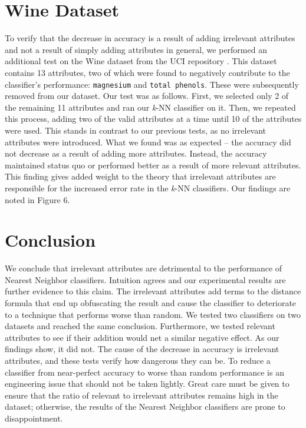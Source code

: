 \documentclass{article}
\begin{document}
\section{Wine Dataset}

To verify that the decrease in accuracy is a result of adding irrelevant attributes and not a result of simply adding attributes in general, we performed an additional test on the Wine dataset from the UCI repository \cite{wine}. This dataset contains 13 attributes, two of which were found to negatively contribute to
the classifier's performance: \texttt{magnesium} and \texttt{total phenols}. These were subsequently removed from our dataset. Our test was as follows. First, we selected only 2 of the remaining 11 attributes and ran our \textit{k}-NN classifier on it. Then, we repeated this process, adding two of the valid attributes at a time until 10 of the attributes were used. This stands in contrast to our previous tests, as no irrelevant attributes were introduced. What we found was as expected -- the accuracy did not decrease as a result of adding more attributes. Instead, the accuracy maintained status quo or performed better as a result of more relevant attributes. This finding gives added weight to the theory that irrelevant attributes are responsible for the increased error rate in the \textit{k}-NN classifiers. Our findings are noted in Figure 6. 

\section{Conclusion}

We conclude that irrelevant attributes are detrimental to the performance of Nearest Neighbor classifiers. Intuition agrees and our experimental results are further evidence to this claim. The irrelevant attributes add terms to the distance formula that end up obfuscating the result and cause the classifier to deteriorate to a technique that performs worse than random. We tested two classifiers on two datasets and reached the same conclusion. Furthermore, we tested relevant attributes to see if their addition would net a similar negative effect. As our findings show, it did not. The cause of the decrease in accuracy is irrelevant attributes, and these tests verify how dangerous they can be. To reduce a classifier from near-perfect accuracy to worse than random performance is an engineering issue that should not be taken lightly. Great care must be given to ensure that the ratio of relevant to irrelevant attributes remains high in the dataset; otherwise, the results of the Nearest Neighbor classifiers are prone to disappointment.
\end{document}
